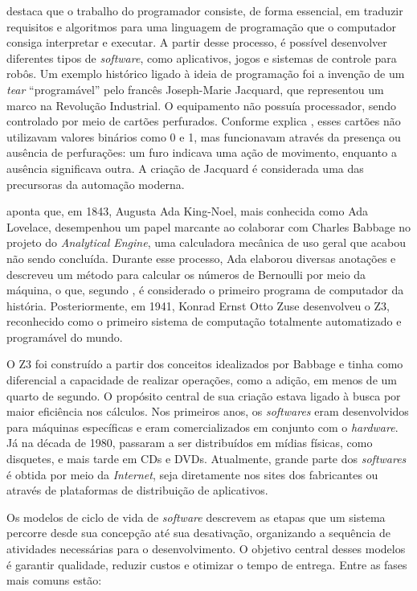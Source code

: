\documentclass[english,brazilian]{UNISINOSartigo} %
\begin{document}
 destaca que o trabalho do programador consiste, de forma essencial, em traduzir requisitos e algoritmos para uma linguagem de programação que o computador consiga interpretar e executar. A partir desse processo, é possível desenvolver diferentes tipos de \textit{software}, como aplicativos, jogos e sistemas de controle para robôs. Um exemplo histórico ligado à ideia de programação foi a invenção de um \textit{tear} “programável” pelo francês Joseph-Marie Jacquard, que representou um marco na Revolução Industrial. O equipamento não possuía processador, sendo controlado por meio de cartões perfurados. Conforme explica , esses cartões não utilizavam valores binários como 0 e 1, mas funcionavam através da presença ou ausência de perfurações: um furo indicava uma ação de movimento, enquanto a ausência significava outra. A criação de Jacquard é considerada uma das precursoras da automação moderna.

 aponta que, em 1843, Augusta Ada King-Noel, mais conhecida como Ada Lovelace, desempenhou um papel marcante ao colaborar com Charles Babbage no projeto do \textit{Analytical Engine}, uma calculadora mecânica de uso geral que acabou não sendo concluída. Durante esse processo, Ada elaborou diversas anotações e descreveu um método para calcular os números de Bernoulli por meio da máquina, o que, segundo , é considerado o primeiro programa de computador da história. Posteriormente, em 1941, Konrad Ernst Otto Zuse desenvolveu o Z3, reconhecido como o primeiro sistema de computação totalmente automatizado e programável do mundo.

O Z3 foi construído a partir dos conceitos idealizados por Babbage e tinha como diferencial a capacidade de realizar operações, como a adição, em menos de um quarto de segundo. O propósito central de sua criação estava ligado à busca por maior eficiência nos cálculos. Nos primeiros anos, os \textit{softwares} eram desenvolvidos para máquinas específicas e eram comercializados em conjunto com o \textit{hardware}. Já na década de 1980, passaram a ser distribuídos em mídias físicas, como disquetes, e mais tarde em CDs e DVDs. Atualmente, grande parte dos \textit{softwares} é obtida por meio da \textit{Internet}, seja diretamente nos sites dos fabricantes ou através de plataformas de distribuição de aplicativos.

Os modelos de ciclo de vida de \textit{software} descrevem as etapas que um sistema percorre desde sua concepção até sua desativação, organizando a sequência de atividades necessárias para o desenvolvimento. O objetivo central desses modelos é garantir qualidade, reduzir custos e otimizar o tempo de entrega. Entre as fases mais comuns estão:
\end{document}
